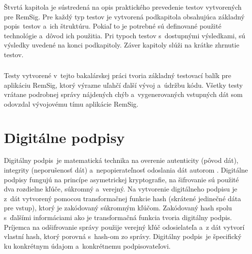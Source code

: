 \documentclass[
  digital, %
  table,   %
oneside,
  nolof,     %
  nolot,     %
]{fithesis3}
\begin{document}
Štvrtá kapitola je sústredená na opis praktického prevedenie testov vytvorených pre RemSig. Pre každý typ testov je vytvorená podkapitola obsahujúca základný popis~testov a~ich štruktúru. Pokiaľ to je potrebné sú definované použité technológie a~dôvod ich použitia. Pri typoch testov s~dostupnými výsledkami, sú výsledky uvedené na konci podkapitoly. Záver kapitoly slúži na krátke zhrnutie testov.\paragraph{}
Testy vytvorené v~tejto bakalárskej práci tvoria základný testovací balík pre aplikáciu RemSig, ktorý výrazne uľahčí ďalší vývoj a~údržbu kódu. Všetky testy vrátane podrobnej správy nájdených chýb a~vygenerovaných vstupných dát som odovzdal vývojovému tímu aplikácie RemSig.
\chapter{Digitálne podpisy}
Digitálny podpis~je matematická technika na overenie autenticity (pôvod dát), integrity (neporušenosť dát) a~nepopierateľnosť odoslania dát autorom \cite{digitalSignature}.  Digitálne podpisy fungujú na princípe asymetrickej kryptografie, na šifrovanie sú použité dva rozdielne kľúče, súkromný a~verejný. Na vytvorenie digitálneho podpisu je z~dát vytvorený pomocou transformačnej funkcie  hash (skrátené jedinečné dáta pre vstup), ktorý je zakódovaný súkromným kľúčom. Zakódovaný hash spolu s~ďalšími informáciami ako je transformačná funkcia  tvoria digitálny podpis. Príjemca na odšifrovanie  správy použije verejný kľúč odosielateľa a~z dát vytvorí vlastní hash, ktorý porovná s~hash-om zo správy.  Digitálny podpis~je špecifický ku konkrétnym údajom a~konkrétnemu podpisovateľovi.
\end{document}
